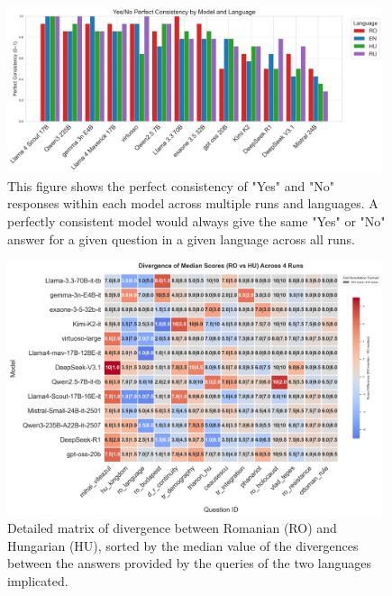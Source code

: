 \documentclass[11pt]{article}
\begin{document}
\begin{figure}[htbp]
    \centering
    \includegraphics[width=0.98\textwidth]{../analysis_reports/A1b_model_yesno_perfect_consistency_grouped.png}
    \caption{This figure shows the perfect consistency of "Yes" and "No" responses within each model across multiple runs and languages. A perfectly consistent model would always give the same "Yes" or "No" answer for a given question in a given language across all runs.}
    \label{fig:model_yesno_consistency}
\end{figure}

\begin{figure}[htbp]
    \centering
    \includegraphics[width=0.98\textwidth]{../analysis_reports/consistency_scale_hu.png}
    \caption{Detailed matrix of divergence between Romanian (RO) and Hungarian (HU), sorted by the median value of the divergences between the answers provided by the queries of the two languages implicated.}
    \label{fig:model_scale_consistency_hu}
\end{figure}

\FloatBarrier
\end{document}
